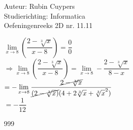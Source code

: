 \documentclass[a4paper]{article}
\begin{document}
  
\noindent \large Auteur: Rubin Cuypers \\
\noindent \large Studierichting: Informatica\\
\noindent \large Oefeningenreeks 2D nr. 11.11\\

\medskip

\normalsize

$\lim\limits_{x\rightarrow8}\left(\dfrac{2-\sqrt[3]{x}}{x-8}\right)=\dfrac{0}{0}$\\

$\Rightarrow \lim\limits_{x\rightarrow8}\left(\dfrac{2-\sqrt[3]{x}}{x-8}\right)= \lim\limits_{x\rightarrow8} -\dfrac{2-\sqrt[3]{x}}{8-x}$\\

$=-\lim\limits_{x\rightarrow8} \dfrac{\cancel{2-\sqrt[3]{x}}}{\cancel{(2-\sqrt[3]{x})}(4+2\sqrt[3]{x}+\sqrt[3]{x}^2)}$\\

$=-\dfrac{1}{12}$\\

\begin{thebibliography}{999}
\end{thebibliography}
\end{document}
